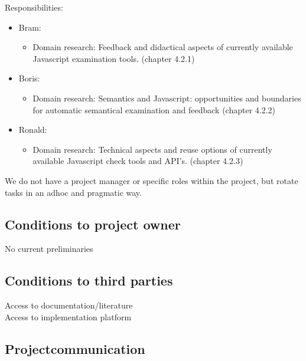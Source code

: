\documentclass{article}
\begin{document}
\begin{itemize}
Responsibilities:
\begin{itemize}
  \item Bram: 
	\begin{itemize}
	\item Domain research: Feedback and didactical aspects of currently available Javascript examination tools. (chapter 4.2.1)
	\end{itemize}
  \item Boris:
	\begin{itemize}
	\item Domain research: Semantics and Javascript: opportunities and boundaries for automatic semantical examination and feedback (chapter 4.2.2)
	\end{itemize}
  \item Ronald:
	\begin{itemize}
	\item Domain research: Technical aspects and reuse options of currently available Javascript check tools and API's. (chapter 4.2.3)
	\end{itemize}
\end{itemize}

We do not have a project manager or specific roles within the project, but rotate tasks in an adhoc and pragmatic way.

\subsection{Conditions to project owner}

No current preliminaries

\subsection{Conditions to third parties}

Access to documentation/literature\\
Access to implementation platform

\subsection{Projectcommunication}


\end{itemize}
\end{document}
